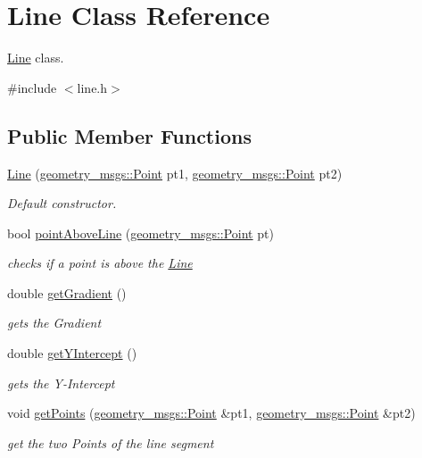 \hypertarget{classLine}{}\section{Line Class Reference}
\label{classLine}


\hyperlink{classLine}{Line} class.  




{\ttfamily \#include $<$line.\+h$>$}

\subsection*{Public Member Functions}
\begin{DoxyCompactItemize}
\item 
\hyperlink{classLine_abad81a289f4a192ebdfdaae35dcd8a87}{Line} (\hyperlink{structgeometry__msgs_1_1Point}{geometry\+\_\+msgs\+::\+Point} pt1, \hyperlink{structgeometry__msgs_1_1Point}{geometry\+\_\+msgs\+::\+Point} pt2)
\begin{DoxyCompactList}\small\item\em Default constructor. \end{DoxyCompactList}\item 
bool \hyperlink{classLine_a058bf81f941f204ec351925660c296b3}{point\+Above\+Line} (\hyperlink{structgeometry__msgs_1_1Point}{geometry\+\_\+msgs\+::\+Point} pt)
\begin{DoxyCompactList}\small\item\em checks if a point is above the \hyperlink{classLine}{Line} \end{DoxyCompactList}\item 
double \hyperlink{classLine_a872b756c94ed478d05e430ebb436b116}{get\+Gradient} ()
\begin{DoxyCompactList}\small\item\em gets the Gradient \end{DoxyCompactList}\item 
double \hyperlink{classLine_ac3bf0f79e9748a26ad1dd347fe97da75}{get\+Y\+Intercept} ()
\begin{DoxyCompactList}\small\item\em gets the Y-\/\+Intercept \end{DoxyCompactList}\item 
void \hyperlink{classLine_acc07117e5463e70ee1159b55d5dc4502}{get\+Points} (\hyperlink{structgeometry__msgs_1_1Point}{geometry\+\_\+msgs\+::\+Point} \&pt1, \hyperlink{structgeometry__msgs_1_1Point}{geometry\+\_\+msgs\+::\+Point} \&pt2)
\begin{DoxyCompactList}\small\item\em get the two Points of the line segment \end{DoxyCompactList}\end{DoxyCompactItemize}


